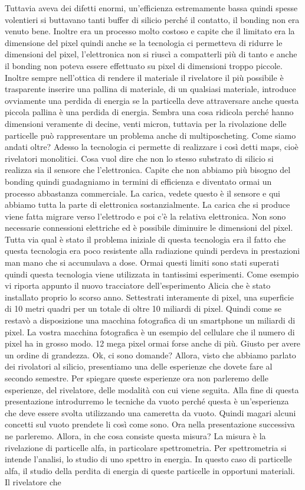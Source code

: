 Tuttavia aveva dei difetti enormi, un'efficienza estremamente bassa quindi spesse volentieri si buttavano tanti buffer di silicio perché il contatto, il bonding non era venuto bene. Inoltre era un processo molto costoso e capite che il limitato era la dimensione del pixel quindi anche se la tecnologia ci permetteva di ridurre le dimensioni del pixel, l'elettronica non si riuscì a compatterli più di tanto e anche il bonding non poteva essere effettuato su pixel di dimensioni troppo piccole. Inoltre sempre nell'ottica di rendere il materiale il rivelatore il più possibile è trasparente inserire una pallina di materiale, di un qualsiasi materiale, introduce ovviamente una perdida di energia se la particella deve attraversare anche questa piccola pallina è una perdida di energia. Sembra una cosa ridicola perché hanno dimensioni veramente di decine, venti micron, tuttavia per la rivolazione delle particelle può rappresentare un problema anche di multiposcheting. Come siamo andati oltre? Adesso la tecnologia ci permette di realizzare i così detti maps, cioè rivelatori monolitici. Cosa vuol dire che non lo stesso substrato di silicio si realizza sia il sensore che l'elettronica. Capite che non abbiamo più bisogno del bonding quindi guadagniamo in termini di efficienza e diventato ormai un processo abbastanza commerciale. La carica, vedete questo è il sensore e qui abbiamo tutta la parte di elettronica sostanzialmente. La carica che si produce viene fatta migrare verso l'elettrodo e poi c'è la relativa elettronica. Non sono necessarie connessioni elettriche ed è possibile diminuire le dimensioni del pixel. Tutta via qual è stato il problema iniziale di questa tecnologia era il fatto che questa tecnologia era poco resistente alla radiazione quindi perdeva in prestazioni man mano che si accumulava a dose. Ormai questi limiti sono stati superati quindi questa tecnologia viene utilizzata in tantissimi esperimenti. Come esempio vi riporta appunto il nuovo tracciatore dell'esperimento Alicia che è stato installato proprio lo scorso anno. Settestrati interamente di pixel, una superficie di 10 metri quadri per un totale di oltre 10 miliardi di pixel. Quindi come se restavò a disposizione una macchina fotografica di un smartphone un miliardi di pixel. La vostra macchina fotografica è un esempio del cellulare che il numero di pixel ha in grosso modo. 12 mega pixel ormai forse anche di più. Giusto per avere un ordine di grandezza. Ok, ci sono domande? Allora, visto che abbiamo parlato dei rivolatori al silicio, presentiamo una delle esperienze che dovete fare al secondo semestre. Per spiegare queste esperienze ora non parleremo delle esperienze, del rivelatore, delle modalità con cui viene seguita. Alla fine di questa presentazione introdurremo le tecniche da vuoto perché questa è un'esperienza che deve essere svolta utilizzando una cameretta da vuoto. Quindi magari alcuni concetti sul vuoto prendete li così come sono. Ora nella presentazione successiva ne parleremo. Allora, in che cosa consiste questa misura? La misura è la rivelazione di particelle alfa, in particolare spettrometria. Per spettrometria si intende l'analisi, lo studio di uno spettro in energia. In questo caso di particelle alfa, il studio della perdita di energia di queste particelle in opportuni materiali. Il rivelatore che 